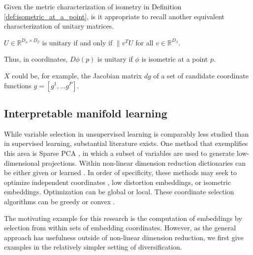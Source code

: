 Given the metric characterization of isometry in Definition \ref{def:isometric_at_a_point}, is it appropriate to recall another equivalent characterization of unitary matrices.
\begin{proposition}
\label{prop:unitary_spectrum}
$U \in \mathbb{R}^{D_\alpha \times D_\beta}$ is unitary if and only if $\| v^T  U$ for all $v \in \mathbb R^{D_\beta}$.
\end{proposition}
Thus, in coordinates, $D \phi (p)$ is unitary if $\phi$ is isometric at a point $p$.

$X$ could be, for example, the Jacobian matrix $d g$ of a set of candidate coordinate functions $g = [g^1, \dotsc g^P]$.


\subsection{Interpretable manifold learning}

While variable selection in unsupervised learning is comparably less studied than in supervised learning, substantial literature exists.
One method that exemplifies this area is Sparse PCA \cite{Dey2017-mx}, in which a subset of variables are used to generate low-dimensional projections.
Within non-linear dimension reduction dictionaries can be either given \cite{Koelle2022-ju, Koelle2024-no} or learned \cite{Kohli2021-lr}. 
In order of specificity, these methods may seek to optimize independent coordinates \cite{Chen2019-km, He2023-ch}, low distortion embeddings, or isometric embeddings.
Optimization can be global or local.
These coordinate selection algorithms can be greedy  or convex \cite{Koelle2022-ju, Koelle2024-no}.


The motivating example for this research is the computation of embeddings by selection from within sets of embedding coordinates.
However, as the general approach has usefulness outside of non-linear dimension reduction, we first give examples in the relatively simpler setting of diversification.